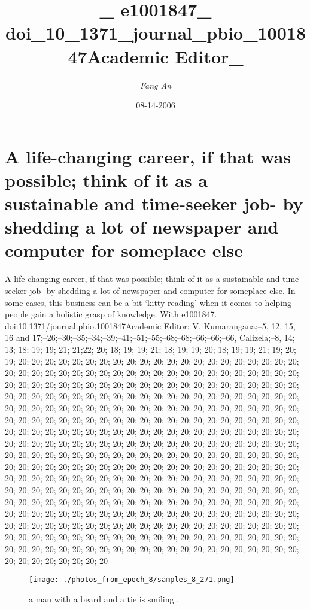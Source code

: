 \documentclass{article}%
\title{\_ e1001847\_ doi\_10\_1371\_journal\_pbio\_1001847Academic Editor\_}%
\author{\textit{Fang An}}%
\date{08-14-2006}%
\begin{document}
%
\normalsize%
\maketitle%
\section{A life{-}changing career, if that was possible; think of it as a sustainable and time{-}seeker job{-} by shedding a lot of newspaper and computer for someplace else}%
\label{sec:Alife{-}changingcareer,ifthatwaspossiblethinkofitasasustainableandtime{-}seekerjob{-}bysheddingalotofnewspaperandcomputerforsomeplaceelse}%
A life{-}changing career, if that was possible; think of it as a sustainable and time{-}seeker job{-} by shedding a lot of newspaper and computer for someplace else.\newline%
In some cases, this business can be a bit ‘kitty{-}reading’ when it comes to helping people gain a holistic grasp of knowledge. With e1001847. doi:10.1371/journal.pbio.1001847Academic Editor: V. Kumarangana;–5, 12, 15, 16 and 17;–26;–30;–35;–34;–39;–41;–51;–55;–68;–68;–66;–66;–66, Calizela;–8, 14; 13; 18; 19; 19; 21; 21;22; 20; 18; 19; 19; 21; 18; 19; 19; 20; 18; 19; 19; 21; 19; 20; 19; 20; 20; 20; 20; 20; 20; 20; 20; 20; 20; 20; 20; 20; 20; 20; 20; 20; 20; 20; 20; 20; 20; 20; 20; 20; 20; 20; 20; 20; 20; 20; 20; 20; 20; 20; 20; 20; 20; 20; 20; 20; 20; 20; 20; 20; 20; 20; 20; 20; 20; 20; 20; 20; 20; 20; 20; 20; 20; 20; 20; 20; 20; 20; 20; 20; 20; 20; 20; 20; 20; 20; 20; 20; 20; 20; 20; 20; 20; 20; 20; 20; 20; 20; 20; 20; 20; 20; 20; 20; 20; 20; 20; 20; 20; 20; 20; 20; 20; 20; 20; 20; 20; 20; 20; 20; 20; 20; 20; 20; 20; 20; 20; 20; 20; 20; 20; 20; 20; 20; 20; 20; 20; 20; 20; 20; 20; 20; 20; 20; 20; 20; 20; 20; 20; 20; 20; 20; 20; 20; 20; 20; 20; 20; 20; 20; 20; 20; 20; 20; 20; 20; 20; 20; 20; 20; 20; 20; 20; 20; 20; 20; 20; 20; 20; 20; 20; 20; 20; 20; 20; 20; 20; 20; 20; 20; 20; 20; 20; 20; 20; 20; 20; 20; 20; 20; 20; 20; 20; 20; 20; 20; 20; 20; 20; 20; 20; 20; 20; 20; 20; 20; 20; 20; 20; 20; 20; 20; 20; 20; 20; 20; 20; 20; 20; 20; 20; 20; 20; 20; 20; 20; 20; 20; 20; 20; 20; 20; 20; 20; 20; 20; 20; 20; 20; 20; 20; 20; 20; 20; 20; 20; 20; 20; 20; 20; 20; 20; 20; 20; 20; 20; 20; 20; 20; 20; 20; 20; 20; 20; 20; 20; 20; 20; 20; 20; 20; 20; 20; 20; 20; 20; 20; 20; 20; 20; 20; 20; 20; 20; 20; 20; 20; 20; 20; 20; 20; 20; 20; 20; 20; 20; 20; 20; 20; 20; 20; 20; 20; 20; 20; 20; 20; 20; 20; 20; 20; 20; 20; 20; 20; 20; 20; 20; 20; 20; 20; 20; 20; 20; 20; 20; 20; 20; 20; 20; 20; 20; 20; 20; 20; 20; 20; 20; 20; 20; 20; 20; 20; 20; 20; 20; 20; 20; 20; 20; 20; 20; 20; 20; 20; 20; 20; 20; 20; 20; 20; 20; 20; 20; 20; 20; 20; 20; 20; 20; 20; 20; 20; 20; 20; 20; 20; 20; 20; 20; 20; 20; 20; 20; 20; 20

%


\begin{figure}[h!]%
\centering%
\texttt{[image: ./photos\_from\_epoch\_8/samples\_8\_271.png]}%
\caption{a man with a beard and a tie is smiling .}%
\end{figure}

%
\end{document}
